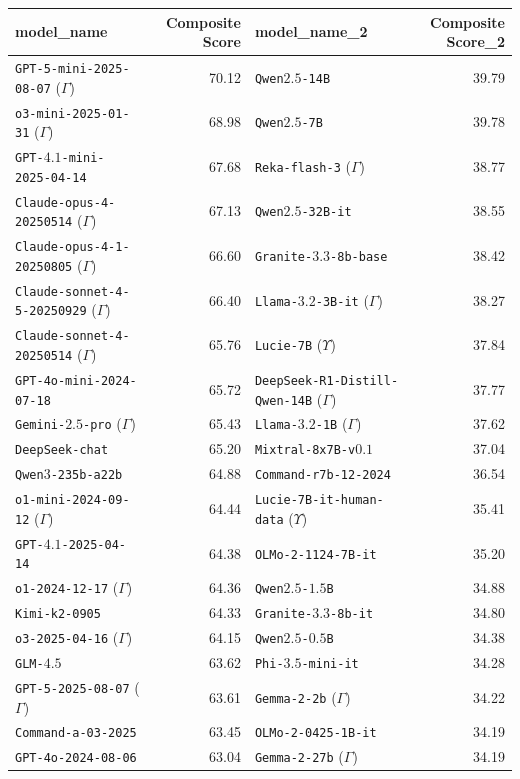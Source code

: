 \begin{tabular}{lrlr}
\toprule
model_name & Composite Score & model_name_2 & Composite Score_2 \\
\midrule
\texttt{GPT-5-mini-2025-08-07} ($\Gamma$) & 70.12 & \texttt{Qwen$2.5$-14B} & 39.79 \\
\texttt{o3-mini-2025-01-31} ($\Gamma$) & 68.98 & \texttt{Qwen$2.5$-7B} & 39.78 \\
\texttt{GPT-$4.1$-mini-2025-04-14} & 67.68 & \texttt{Reka-flash-3} ($\Gamma$) & 38.77 \\
\texttt{Claude-opus-4-20250514} ($\Gamma$) & 67.13 & \texttt{Qwen$2.5$-32B-it} & 38.55 \\
\texttt{Claude-opus-4-1-20250805} ($\Gamma$) & 66.60 & \texttt{Granite-$3.3$-8b-base} & 38.42 \\
\texttt{Claude-sonnet-4-5-20250929} ($\Gamma$) & 66.40 & \texttt{Llama-$3.2$-3B-it} ($\Gamma$) & 38.27 \\
\texttt{Claude-sonnet-4-20250514} ($\Gamma$) & 65.76 & \texttt{Lucie-7B} ($\Upsilon$) & 37.84 \\
\texttt{GPT-4o-mini-2024-07-18} & 65.72 & \texttt{DeepSeek-R1-Distill-Qwen-14B} ($\Gamma$) & 37.77 \\
\texttt{Gemini-$2.5$-pro} ($\Gamma$) & 65.43 & \texttt{Llama-$3.2$-1B} ($\Gamma$) & 37.62 \\
\texttt{DeepSeek-chat} & 65.20 & \texttt{Mixtral-8x7B-v$0.1$} & 37.04 \\
\texttt{Qwen$3$-235b-a22b} & 64.88 & \texttt{Command-r7b-12-2024} & 36.54 \\
\texttt{o1-mini-2024-09-12} ($\Gamma$) & 64.44 & \texttt{Lucie-7B-it-human-data} ($\Upsilon$) & 35.41 \\
\texttt{GPT-$4.1$-2025-04-14} & 64.38 & \texttt{OLMo-2-1124-7B-it} & 35.20 \\
\texttt{o1-2024-12-17} ($\Gamma$) & 64.36 & \texttt{Qwen$2.5$-$1.5$B} & 34.88 \\
\texttt{Kimi-k2-0905} & 64.33 & \texttt{Granite-$3.3$-8b-it} & 34.80 \\
\texttt{o3-2025-04-16} ($\Gamma$) & 64.15 & \texttt{Qwen$2.5$-$0.5$B} & 34.38 \\
\texttt{GLM-$4.5$} & 63.62 & \texttt{Phi-$3.5$-mini-it} & 34.28 \\
\texttt{GPT-5-2025-08-07} ($\Gamma$) & 63.61 & \texttt{Gemma-2-2b} ($\Gamma$) & 34.22 \\
\texttt{Command-a-03-2025} & 63.45 & \texttt{OLMo-2-0425-1B-it} & 34.19 \\
\texttt{GPT-4o-2024-08-06} & 63.04 & \texttt{Gemma-2-27b} ($\Gamma$) & 34.19 \\

\end{tabular}
